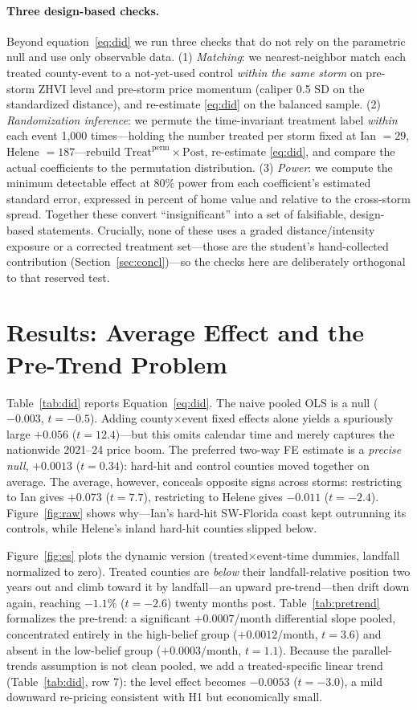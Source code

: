 \documentclass[12pt]{article}
\begin{document}
\paragraph{Three design-based checks.} Beyond equation~\eqref{eq:did} we run three checks that
do not rely on the parametric null and use only observable data. (1) \emph{Matching}: we
nearest-neighbor match each treated county-event to a not-yet-used control \emph{within the same
storm} on pre-storm ZHVI level and pre-storm price momentum (caliper 0.5 SD on the standardized
distance), and re-estimate \eqref{eq:did} on the balanced sample. (2) \emph{Randomization
inference}: we permute the time-invariant treatment label \emph{within} each event 1{,}000
times---holding the number treated per storm fixed at Ian $=29$, Helene $=187$---rebuild
$\text{Treat}^{\text{perm}}\times\text{Post}$, re-estimate \eqref{eq:did}, and compare the actual
coefficients to the permutation distribution. (3) \emph{Power}: we compute the minimum detectable
effect at 80\% power from each coefficient's estimated standard error, expressed in percent of
home value and relative to the cross-storm spread. Together these convert ``insignificant'' into
a set of falsifiable, design-based statements. Crucially, none of these uses a graded
distance/intensity exposure or a corrected treatment set---those are the student's hand-collected
contribution (Section~\ref{sec:concl})---so the checks here are deliberately orthogonal to that
reserved test.

\section{Results: Average Effect and the Pre-Trend Problem}\label{sec:res}
Table~\ref{tab:did} reports Equation~\eqref{eq:did}. The naive pooled OLS is a null
($-0.003$, $t=-0.5$). Adding county$\times$event fixed effects alone yields a spuriously large
$+0.056$ ($t=12.4$)---but this omits calendar time and merely captures the nationwide
2021--24 price boom. The preferred two-way FE estimate is a \emph{precise null},
$+0.0013$ ($t=0.34$): hard-hit and control counties moved together on average. The average,
however, conceals opposite signs across storms: restricting to Ian gives $+0.073$ ($t=7.7$),
restricting to Helene gives $-0.011$ ($t=-2.4$). Figure~\ref{fig:raw} shows why---Ian's
hard-hit SW-Florida coast kept outrunning its controls, while Helene's inland hard-hit
counties slipped below.

Figure~\ref{fig:es} plots the dynamic version (treated$\times$event-time dummies, landfall
normalized to zero). Treated counties are \emph{below} their landfall-relative position two
years out and climb toward it by landfall---an upward pre-trend---then drift down again,
reaching $-1.1\%$ ($t=-2.6$) twenty months post. Table~\ref{tab:pretrend} formalizes the
pre-trend: a significant $+0.0007$/month differential slope pooled, concentrated entirely in
the high-belief group ($+0.0012$/month, $t=3.6$) and absent in the low-belief group
($+0.0003$/month, $t=1.1$). Because the parallel-trends assumption is not clean pooled, we add
a treated-specific linear trend (Table~\ref{tab:did}, row 7): the level effect becomes
$-0.0053$ ($t=-3.0$), a mild downward re-pricing consistent with H1 but economically small.
\end{document}
